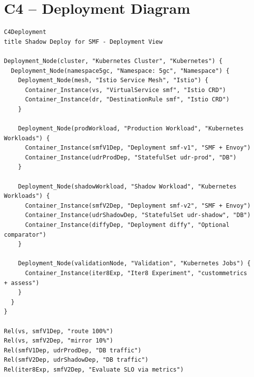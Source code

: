 \section{C4 -- Deployment Diagram}
\begin{lstlisting}[basicstyle=\footnotesize\ttfamily,caption=C4 Deployment Diagram w Mermaid,label=lst:c4-mermaid]
C4Deployment
title Shadow Deploy for SMF - Deployment View

Deployment_Node(cluster, "Kubernetes Cluster", "Kubernetes") {
  Deployment_Node(namespace5gc, "Namespace: 5gc", "Namespace") {
    Deployment_Node(mesh, "Istio Service Mesh", "Istio") {
      Container_Instance(vs, "VirtualService smf", "Istio CRD")
      Container_Instance(dr, "DestinationRule smf", "Istio CRD")
    }

    Deployment_Node(prodWorkload, "Production Workload", "Kubernetes Workloads") {
      Container_Instance(smfV1Dep, "Deployment smf-v1", "SMF + Envoy")
      Container_Instance(udrProdDep, "StatefulSet udr-prod", "DB")
    }

    Deployment_Node(shadowWorkload, "Shadow Workload", "Kubernetes Workloads") {
      Container_Instance(smfV2Dep, "Deployment smf-v2", "SMF + Envoy")
      Container_Instance(udrShadowDep, "StatefulSet udr-shadow", "DB")
      Container_Instance(diffyDep, "Deployment diffy", "Optional comparator")
    }

    Deployment_Node(validationNode, "Validation", "Kubernetes Jobs") {
      Container_Instance(iter8Exp, "Iter8 Experiment", "custommetrics + assess")
    }
  }
}

Rel(vs, smfV1Dep, "route 100%")
Rel(vs, smfV2Dep, "mirror 10%")
Rel(smfV1Dep, udrProdDep, "DB traffic")
Rel(smfV2Dep, udrShadowDep, "DB traffic")
Rel(iter8Exp, smfV2Dep, "Evaluate SLO via metrics")
\end{lstlisting}
